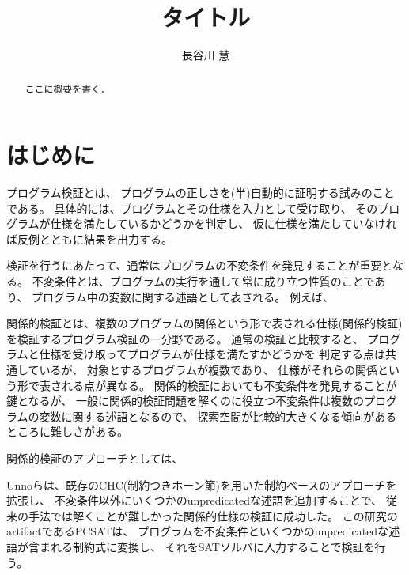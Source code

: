\documentclass[uplatex]{suribt}
\title{タイトル}
\author{長谷川 慧}
\begin{document}
\maketitle%

\frontmatter%
\begin{abstract}%
 ここに概要を書く．
\end{abstract}

\tableofcontents%

\mainmatter%
\chapter{はじめに}
プログラム検証とは、
プログラムの正しさを(半)自動的に証明する試みのことである。%
具体的には、プログラムとその仕様を入力として受け取り、
そのプログラムが仕様を満たしているかどうかを判定し、
仮に仕様を満たしていなければ反例とともに結果を出力する。

検証を行うにあたって、通常はプログラムの不変条件を発見することが重要となる。
不変条件とは、プログラムの実行を通して常に成り立つ性質のことであり、
プログラム中の変数に関する述語として表される。
例えば、

関係的検証とは、複数のプログラムの関係という形で表される仕様(関係的検証)
を検証するプログラム検証の一分野である。
通常の検証と比較すると、
プログラムと仕様を受け取ってプログラムが仕様を満たすかどうかを
判定する点は共通しているが、
対象とするプログラムが複数であり、
仕様がそれらの関係という形で表される点が異なる。%
関係的検証においても不変条件を発見することが鍵となるが、%
一般に関係的検証問題を解くのに役立つ不変条件は複数のプログラムの変数に関する述語となるので、
探索空間が比較的大きくなる傾向があるところに難しさがある。%

関係的検証のアプローチとしては、


Unnoらは、既存のCHC(制約つきホーン節)を用いた制約ベースのアプローチを拡張し、
不変条件以外にいくつかのunpredicatedな述語を追加することで、
従来の手法では解くことが難しかった関係的仕様の検証に成功した。
この研究のartifactであるPCSATは、
プログラムを不変条件といくつかのunpredicatedな述語が含まれる制約式に変換し、
それをSATソルバに入力することで検証を行う。
\end{document}
